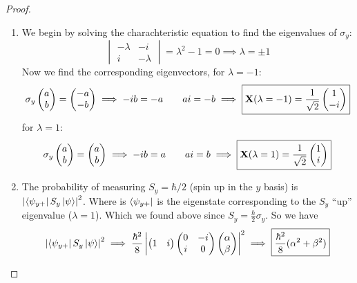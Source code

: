 \begin{proof}

    \begin{enumerate}
        \item We begin by solving the charachteristic equation to find
            the eigenvalues of $\sigma_y$:
            \[
            \begin{vmatrix}
                -\lambda & -i \\
                i & -\lambda
            \end{vmatrix} = \lambda^2 -  1 = 0 \implies
            \boxed{\lambda = \pm 1}
            \]
            Now we find the corresponding eigenvectors, for $\lambda =
            -1$:
            \[
            \sigma_y \begin{pmatrix} a \\ b \end{pmatrix} = \begin{pmatrix} -a \\ -b \end{pmatrix} \implies
            -ib = -a \qquad ai = -b \implies
            \boxed{\mathbf{X}(\lambda = -1) =
            \frac{1}{\sqrt{2}}\begin{pmatrix} 1 \\ -i \end{pmatrix}}
            \]
            for $\lambda = 1$:
            \[
            \sigma_y \begin{pmatrix} a \\ b \end{pmatrix} = \begin{pmatrix} a \\ b \end{pmatrix} \implies
            -ib = a \qquad ai = b \implies
            \boxed{\mathbf{X}(\lambda = 1) =
            \frac{1}{\sqrt{2}}\begin{pmatrix} 1 \\ i \end{pmatrix}}
            \]

        \item
            The probability of measuring $S_y = \hbar/2$ (spin up in the
            $y$ basis) is $\left|\left< \psi_{y+} \right| S_y
            \left| \psi \right>\right|^2$. Where is $\left< \psi_{y+} \right|$ is the
            eigenstate corresponding to the
            $S_y$ ``up'' eigenvalue ($\lambda = 1$). Which we found
            above since $S_y = \frac{\hbar}{2}\sigma_y$. So we have
            \[
                \left| \left< \psi_{y+} \right| S_y \left| \psi \right> \right|^2 \implies
                \frac{\hbar^2}{8} \left|
                    \begin{pmatrix} 1 & i \end{pmatrix}
                    \begin{pmatrix} 0 & -i \\ i & 0 \end{pmatrix}
                    \begin{pmatrix} \alpha \\ \beta \end{pmatrix} \right|^2 \implies
                    \boxed{\frac{\hbar^2}{8}(\alpha^2 + \beta^2)}
            \]

    \end{enumerate}


\end{proof}


